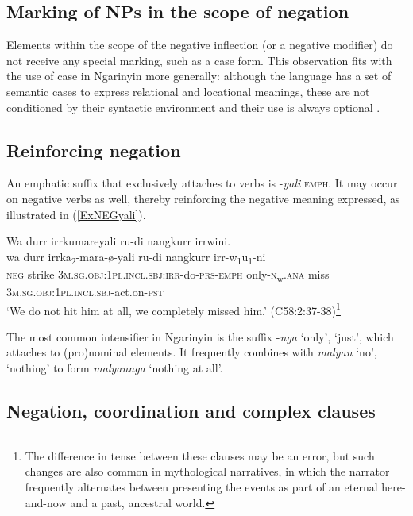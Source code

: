 \documentclass[output=paper,colorlinks,citecolor=brown]{langscibook}
\begin{document}
\subsection{Marking of NPs in the scope of negation}

Elements within the scope of the negative inflection (or a negative modifier) do not receive any special marking, such as a case form. This observation fits with the use of case in Ngarinyin more generally: although the language has a set of semantic cases to express relational and locational meanings, these are not conditioned by their syntactic environment and their use is always optional \citep[cf.][19--25]{Spronck2015}.

\subsection{Reinforcing negation}

An emphatic suffix that exclusively attaches to verbs is -\textit{yali} \textsc{emph}. It may occur on negative verbs as well, thereby reinforcing the negative meaning expressed, as illustrated in (\ref{ExNEGyali}).

\ea \label{ExNEGyali}
    \glll Wa durr irrkumareyali ru-di nangkurr\phantom{---} irrwini.\\
    wa durr irrka\textsubscript{2}-mara-{\o}-yali ru-di nangkurr irr-w\textsubscript{1}u\textsubscript{1}-ni\\
    \textsc{neg} strike \textsc{3m.sg.obj:1pl.incl.sbj:irr}-do-\textsc{prs}-\textsc{emph} only-\textsc{n}\textsubscript{w}.\textsc{ana} miss \textsc{3m.sg.obj:1pl.incl.sbj}-act.on-\textsc{pst}\\
    \trans `We do not hit him at all, we completely missed him.' (C58:2:37-38)\footnote{The difference in tense between these clauses may be an error, but such changes are also common in mythological narratives, in which the narrator frequently alternates between presenting the events as part of an eternal here-and-now and a past, ancestral world.}
\z

The most common intensifier in Ngarinyin is the suffix -\textit{nga} `only', `just', which attaches to (pro)nominal elements. It frequently combines with \textit{malyan} `no', `nothing' to form \textit{malyannga} `nothing at all'.

\subsection{Negation, coordination and complex clauses}
\end{document}
